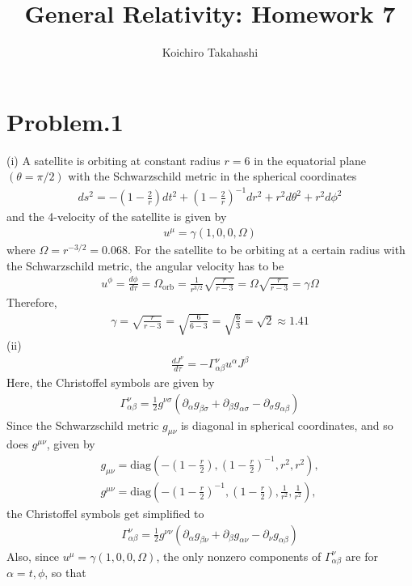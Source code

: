 \documentclass[12pt]{article}
\begin{document}
\title{General Relativity: Homework 7}
\author{Koichiro Takahashi}
\maketitle

\section*{Problem.1}
(i)
A satellite is orbiting at constant radius $r = 6$ in the equatorial plane $(\theta = \pi/2)$ with the Schwarzschild metric in the spherical coordinates
\begin{align}
ds^2 = - \left(1 - \frac{2}{r} \right) dt^2 + \left(1 - \frac{2}{r}\right)^{-1} dr^2 + r^2 d\theta^2 + r^2 d \phi^2
\end{align}
and the 4-velocity of the satellite is given by
\begin{align}
u^{\mu} = \gamma \left(1, 0, 0, \Omega\right)
\end{align}
where $\Omega = r^{-3/2} = 0.068$. For the satellite to be orbiting at a certain radius with the Schwarzschild metric, the angular velocity has to be
\begin{align}
u^{\phi} = \frac{d \phi}{d \tau} = \Omega_{\mathrm{orb}} = \frac{1}{r^{3/2}} \sqrt{\frac{r}{r - 3}} = \Omega \sqrt{\frac{r}{r - 3}} = \gamma \Omega
\end{align}
Therefore,
\begin{align}
\gamma = \sqrt{\frac{r}{r - 3}} = \sqrt{\frac{6}{6 - 3}} = \sqrt{\frac{6}{3}} = \sqrt{2} \approx 1.41
\end{align}
(ii)
\begin{align}
\frac{d J^{\nu}}{d \tau} = - \Gamma^{\nu}_{\alpha \beta} u^{\alpha} J^{\beta}
\end{align}
Here, the Christoffel symbols are given by
\begin{align}
\Gamma^{\nu}_{\alpha \beta} = \frac{1}{2} g^{\nu \sigma} \left(\partial_{\alpha} g_{\beta \sigma} + \partial_{\beta} g_{\alpha \sigma} - \partial_{\sigma} g_{\alpha \beta}\right)
\end{align}
Since the Schwarzschild metric $g_{\mu \nu}$ is diagonal in spherical coordinates, and so does $g^{\mu \nu}$, given by
\begin{align}
g_{\mu \nu} = \mathrm{diag}\left(- \left(1 - \frac{r}{2} \right), \left(1 - \frac{r}{2} \right)^{-1}, r^2, r^2 \right), \\
g^{\mu \nu} = \mathrm{diag}\left(- \left(1 - \frac{r}{2} \right)^{-1}, \left(1 - \frac{r}{2} \right), \frac{1}{r^2}, \frac{1}{r^2} \right),
\end{align}
the Christoffel symbols get simplified to
\begin{align}
\Gamma^{\nu}_{\alpha \beta} = \frac{1}{2} g^{\nu \nu} \left(\partial_{\alpha} g_{\beta \nu} + \partial_{\beta} g_{\alpha \nu} - \partial_{\nu} g_{\alpha \beta}\right)
\end{align}
Also, since $u^{\mu} = \gamma \left(1, 0, 0, \Omega\right)$, the only nonzero components of $\Gamma^{\nu}_{\alpha \beta}$ are for $\alpha = t, \phi$, so that
\end{document}
